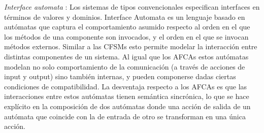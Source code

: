 \emph{Interface automata} \cite{dealfaro:esec-fse-01}: Los sistemas de tipos convencionales especifican interfaces en términos de valores y dominios. Interface Automata es un lenguaje basado en autómatas que captura el comportamiento asumido respecto al orden en el que los métodos de una componente son invocados, y el orden en el que se invocan métodos externos. Similar a las CFSMs esto permite modelar la interacción entre distintas componentes de un sistema. Al igual que los AFCAs estos autómatas modelan no solo comportamiento de la comunicación (a través de acciones de input y output) sino también internas, y pueden componerse dadas ciertas condiciones de compatibilidad. La desventaja respecto a los AFCAs es que las interacciones entre estos autómatas tienen semántica sincrónica, lo que se hace explícito en la composición de dos autómatas donde una acción de salida de un autómata que coincide con la de entrada de otro se transforman en una única acción.\\

